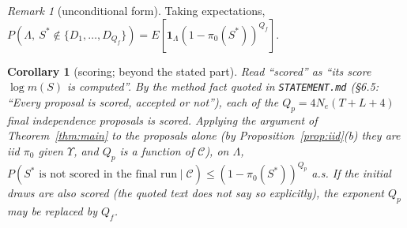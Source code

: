 \documentclass[11pt]{article}
\newtheorem{corollary}[theorem]{Corollary}
\theoremstyle{remark}
\newtheorem{remark}[theorem]{Remark}
\newcommand{\cC}{\mathcal{C}}
\newcommand{\1}{\mathbf{1}}
\begin{document}
\begin{remark}[unconditional form]
Taking expectations, $P(\Lambda,\ S^*\notin\{D_1,\dots,D_{Q_f}\})=E[\1_\Lambda(1-\pi_0(S^*))^{Q_f}]$.
\end{remark}

\begin{corollary}[scoring; beyond the stated part]
Read ``scored'' as ``its score $\log m(S)$ is computed''. By the method fact quoted in \texttt{STATEMENT.md}
(\S6.5: ``Every proposal is scored, accepted or not''), each of the $Q_p=4N_e(T+L+4)$ final independence proposals is
scored. Applying the argument of Theorem~\ref{thm:main} to the proposals alone (by Proposition~\ref{prop:iid}(b) they
are iid $\pi_0$ given $\Upsilon$, and $Q_p$ is a function of $\cC$), on $\Lambda$,
$P(S^*\text{ is not scored in the final run}\mid\cC)\le(1-\pi_0(S^*))^{Q_p}$ a.s. If the initial draws are also scored
(the quoted text does not say so explicitly), the exponent $Q_p$ may be replaced by $Q_f$.
\end{corollary}
\end{document}
